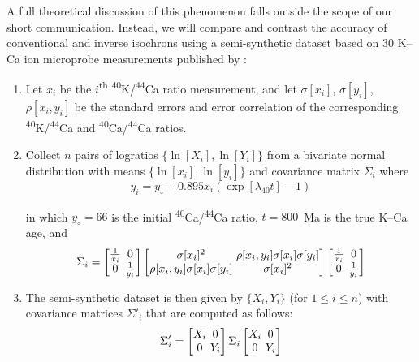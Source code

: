 \documentclass[]{article}
\begin{document}
A full theoretical discussion of this phenomenon falls outside the
scope of our short communication. Instead, we will compare and
contrast the accuracy of conventional and inverse isochrons using a
semi-synthetic dataset based on 30 K--Ca ion microprobe measurements
published by \citet{harrison2010}:

\begin{enumerate}
\item Let $x_i$ be the $i$\textsuperscript{th}
  \textsuperscript{40}K/\textsuperscript{44}Ca ratio measurement, and
  let $\sigma[x_i]$, $\sigma[y_i]$, $\rho[x_i,y_i]$ be the standard
  errors and error correlation of the corresponding
  \textsuperscript{40}K/\textsuperscript{44}Ca and
  \textsuperscript{40}Ca/\textsuperscript{44}Ca ratios.
\item Collect $n$ pairs of logratios $\{\ln[X_i],\ln[Y_i]\}$ from a
  bivariate normal distribution with means $\{\ln[x_i],\ln[y_i]\}$ and
  covariance matrix $\Sigma_i$ where
  \begin{equation}
    y_i = y_\circ + 0.895 x_i (\exp[\lambda_{40} t]-1)
    \label{eq:KCa}
  \end{equation}

  \noindent in which $y_\circ=66$ is the initial
  \textsuperscript{40}Ca/\textsuperscript{44}Ca ratio, $t=800$~Ma is
  the true K--Ca age, and
  \[
  \Sigma_i =
  \left[
    \begin{array}{@{}c@{~}c@{}}
      \frac{1}{x_i} & 0 \\
      0 & \frac{1}{y_i}
    \end{array}
    \right]
  \left[
    \begin{array}{@{}c@{~}c@{}}
      \sigma[x_i]^2 & \rho[x_i,y_i]\sigma[x_i]\sigma[y_i] \\
      \rho[x_i,y_i]\sigma[x_i]\sigma[y_i] & \sigma[x_i]^2\\
    \end{array}
    \right]
  \left[
    \begin{array}{@{}c@{~}c@{}}
      \frac{1}{x_i} & 0 \\
      0 & \frac{1}{y_i}
    \end{array}
    \right]
  \]
\item The semi-synthetic dataset is then given by $\{X_i,Y_i\}$ (for
  $1\leq{i}\leq{n}$) with covariance matrices $\Sigma'_i$ that are
  computed as follows:
  \[
  \Sigma'_i =
  \left[
    \begin{array}{@{}c@{~}c@{}}
      X_i & 0 \\
      0 & Y_i
    \end{array}
    \right]
  \Sigma_i
  \left[
    \begin{array}{@{}c@{~}c@{}}
      X_i & 0 \\
      0 & Y_i
    \end{array}
    \right]
  \]
\end{enumerate}
\end{document}
